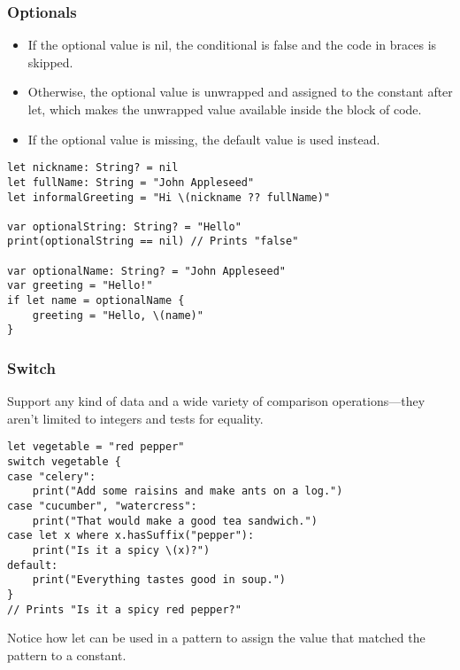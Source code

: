 \begin{frame}[fragile] \frametitle{Optionals}

\begin{itemize}
\item If the optional value is nil, the conditional is false and the code in braces is skipped. 
\item Otherwise, the optional value is unwrapped and assigned to the constant after let, which makes the unwrapped value available inside the block of code.
\item If the optional value is missing, the default value is used instead.
\end{itemize}

\begin{lstlisting}
let nickname: String? = nil
let fullName: String = "John Appleseed"
let informalGreeting = "Hi \(nickname ?? fullName)"

var optionalString: String? = "Hello"
print(optionalString == nil) // Prints "false"

var optionalName: String? = "John Appleseed"
var greeting = "Hello!"
if let name = optionalName {
    greeting = "Hello, \(name)"
}
\end{lstlisting}

\end{frame}

\begin{frame}[fragile] \frametitle{Switch}

Support any kind of data and a wide variety of comparison operations—they aren’t limited to integers and tests for equality.
 
\begin{lstlisting}
let vegetable = "red pepper"
switch vegetable {
case "celery":
    print("Add some raisins and make ants on a log.")
case "cucumber", "watercress":
    print("That would make a good tea sandwich.")
case let x where x.hasSuffix("pepper"):
    print("Is it a spicy \(x)?")
default:
    print("Everything tastes good in soup.")
}
// Prints "Is it a spicy red pepper?"
\end{lstlisting}

Notice how let can be used in a pattern to assign the value that matched the pattern to a constant.

\end{frame}



